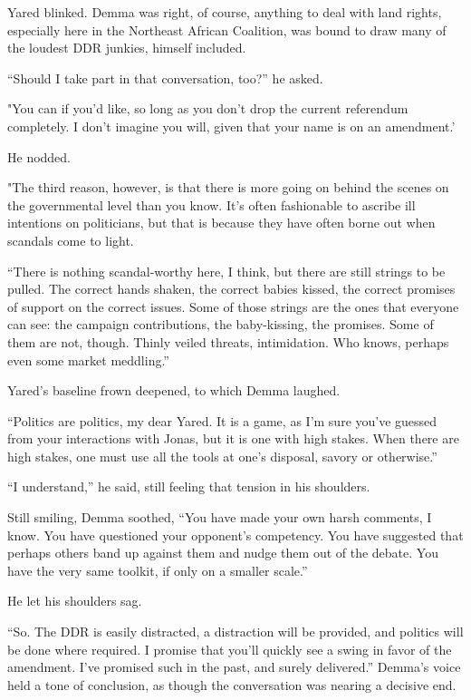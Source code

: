 Yared blinked. Demma was right, of course, anything to deal with land rights, especially here in the Northeast African Coalition, was bound to draw many of the loudest DDR junkies, himself included.

``Should I take part in that conversation, too?'' he asked.

"You can if you'd like, so long as you don't drop the current referendum completely. I don't imagine you will, given that your name is on an amendment.'

He nodded.

"The third reason, however, is that there is more going on behind the scenes on the governmental level than you know. It's often fashionable to ascribe ill intentions on politicians, but that is because they have often borne out when scandals come to light.

``There is nothing scandal-worthy here, I think, but there are still strings to be pulled. The correct hands shaken, the correct babies kissed, the correct promises of support on the correct issues. Some of those strings are the ones that everyone can see: the campaign contributions, the baby-kissing, the promises. Some of them are not, though. Thinly veiled threats, intimidation. Who knows, perhaps even some market meddling.''

Yared's baseline frown deepened, to which Demma laughed.

``Politics are politics, my dear Yared. It is a game, as I'm sure you've guessed from your interactions with Jonas, but it is one with high stakes. When there are high stakes, one must use all the tools at one's disposal, savory or otherwise.''

``I understand,'' he said, still feeling that tension in his shoulders.

Still smiling, Demma soothed, ``You have made your own harsh comments, I know. You have questioned your opponent's competency. You have suggested that perhaps others band up against them and nudge them out of the debate. You have the very same toolkit, if only on a smaller scale.''

He let his shoulders sag.

``So. The DDR is easily distracted, a distraction will be provided, and politics will be done where required. I promise that you'll quickly see a swing in favor of the amendment. I've promised such in the past, and surely delivered.'' Demma's voice held a tone of conclusion, as though the conversation was nearing a decisive end.

